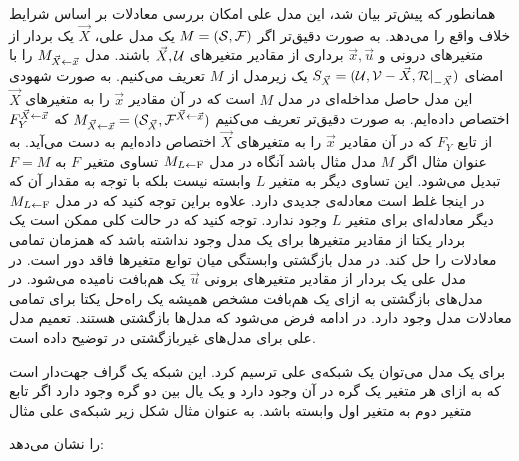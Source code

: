 همانطور که پیش‌تر بیان شد، این مدل علی امکان بررسی معادلات بر اساس شرایط خلاف واقع را می‌دهد.
به صورت دقیق‌تر اگر
$M = (\mathcal{S},\mathcal{F})$
یک مدل علی،
$\vec X$
یک بردار از متغیرهای درونی و
$\vec{x}, \vec{u}$
برداری از مقادیر متغیر‌های
$\vec{X},\mathcal{U}$
باشند.
مدل
$M_{\vec{X}\leftarrow \vec{x}}$
را با امضای
$S_{\vec X}=(\mathcal{U},\mathcal{V}-\vec X,\mathcal{R}|_{\mathcal{-} \vec{X}})$
یک زیرمدل از
$M$
تعریف می‌کنیم.
به صورت شهودی این مدل حاصل مداخله‌ای در مدل
$M$
است که در آن مقادیر
$\vec{x}$
را به متغیر‌های
$\vec{X}$
اختصاص داده‌ایم.
به صورت دقیق‌تر تعریف می‌کنیم
$M_{\vec{X}\leftarrow\vec{x}} = (\mathcal{S}_{\vec{X}},\mathcal{F}^{\vec{X}\leftarrow\vec{x}})$
که
$F_Y^{\vec{X}\leftarrow\vec{x}}$
از تابع
$F_Y$
که در آن مقادیر
$\vec{x}$
را به متغیرهای
$\vec{X}$
اختصاص داده‌ایم به دست می‌آید.
به عنوان مثال اگر
$M$
مدل مثال
باشد آنگاه در مدل
$M_{L\leftarrow \mathrm{F}}$
تساوی متغیر
$F$
به
$F = M$
تبدیل می‌شود.
این تساوی دیگر به متغیر
$L$
وابسته نیست بلکه با توجه به مقدار آن که در اینجا غلط است معادله‌ی جدیدی دارد.
علاوه براین توجه کنید که در مدل
$M_{L\leftarrow \mathrm{F}}$
دیگر معادله‌ای برای متغیر
$L$
وجود ندارد.
توجه کنید که در حالت کلی ممکن است یک بردار یکتا از مقادیر متغیر‌ها برای یک مدل وجود نداشته باشد که همزمان تمامی معادلات را حل کند.
در مدل بازگشتی وابستگی میان توابع متغیر‌ها فاقد دور است.
در مدل علی یک بردار از مقادیر متغیر‌های برونی
$\vec u$
یک هم‌بافت نامیده می‌شود.
در مدل‌های بازگشتی به ازای یک هم‌بافت مشخص همیشه یک راه‌حل یکتا برای تمامی معادلات مدل وجود دارد.
در ادامه فرض می‌شود که مدل‌ها بازگشتی هستند. تعمیم مدل‌ علی برای مدل‌های غیربازگشتی در توضیح داده است.

برای یک مدل می‌توان یک شبکه‌ی علی ترسیم کرد.
این شبکه یک گراف جهت‌دار است که به ازای هر متغیر یک گره در آن وجود دارد و یک یال بین دو گره وجود دارد اگر تابع متغیر دوم به متغیر اول وابسته باشد.
به عنوان مثال شکل زیر شبکه‌ی علی مثال

را نشان می‌دهد:
\begin{center}
\end{center}

